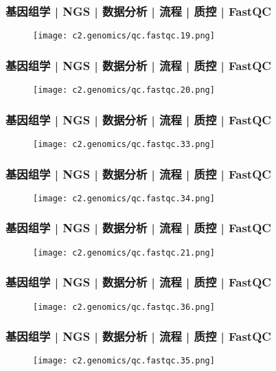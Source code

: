 \begin{frame}
  \frametitle{基因组学 | NGS | 数据分析 | 流程 | 质控 | FastQC}
  \begin{figure}
    \centering
    \texttt{[image: c2.genomics/qc.fastqc.19.png]}
  \end{figure}
\end{frame}

\begin{frame}
  \frametitle{基因组学 | NGS | 数据分析 | 流程 | 质控 | FastQC}
  \begin{figure}
    \centering
    \texttt{[image: c2.genomics/qc.fastqc.20.png]}
  \end{figure}
\end{frame}

\begin{frame}
  \frametitle{基因组学 | NGS | 数据分析 | 流程 | 质控 | FastQC}
  \begin{figure}
    \centering
    \texttt{[image: c2.genomics/qc.fastqc.33.png]}
  \end{figure}
\end{frame}

\begin{frame}
  \frametitle{基因组学 | NGS | 数据分析 | 流程 | 质控 | FastQC}
  \begin{figure}
    \centering
    \texttt{[image: c2.genomics/qc.fastqc.34.png]}
  \end{figure}
\end{frame}

\begin{frame}
  \frametitle{基因组学 | NGS | 数据分析 | 流程 | 质控 | FastQC}
  \begin{figure}
    \centering
    \texttt{[image: c2.genomics/qc.fastqc.21.png]}
  \end{figure}
\end{frame}

\begin{frame}
  \frametitle{基因组学 | NGS | 数据分析 | 流程 | 质控 | FastQC}
  \begin{figure}
    \centering
    \texttt{[image: c2.genomics/qc.fastqc.36.png]}
  \end{figure}
\end{frame}

\begin{frame}
  \frametitle{基因组学 | NGS | 数据分析 | 流程 | 质控 | FastQC}
  \begin{figure}
    \centering
    \texttt{[image: c2.genomics/qc.fastqc.35.png]}
  \end{figure}
\end{frame}

